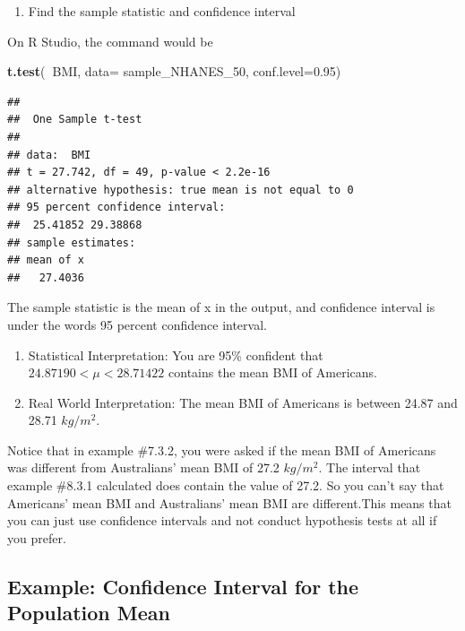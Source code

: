 \documentclass[]{book}
\newenvironment{Shaded}{\begin{snugshade}}{\end{snugshade}}
\newcommand{\DataTypeTok}[1]{\textcolor[rgb]{0.13,0.29,0.53}{#1}}
\newcommand{\DecValTok}[1]{\textcolor[rgb]{0.00,0.00,0.81}{#1}}
\newcommand{\FloatTok}[1]{\textcolor[rgb]{0.00,0.00,0.81}{#1}}
\newcommand{\KeywordTok}[1]{\textcolor[rgb]{0.13,0.29,0.53}{\textbf{#1}}}
\newcommand{\NormalTok}[1]{#1}
\newcommand{\OperatorTok}[1]{\textcolor[rgb]{0.81,0.36,0.00}{\textbf{#1}}}
\providecommand{\tightlist}{%
  \setlength{\itemsep}{0pt}\setlength{\parskip}{0pt}}
\begin{document}
\begin{enumerate}
\def\labelenumi{\arabic{enumi}.}
\setcounter{enumi}{3}
\tightlist
\item
  Find the sample statistic and confidence interval
\end{enumerate}

On R Studio, the command would be

\begin{Shaded}
\begin{Highlighting}[]
\KeywordTok{t.test}\NormalTok{(}\OperatorTok{~}\NormalTok{BMI, }\DataTypeTok{data=}\NormalTok{ sample_NHANES_}\DecValTok{50}\NormalTok{, }\DataTypeTok{conf.level=}\FloatTok{0.95}\NormalTok{)}
\end{Highlighting}
\end{Shaded}

\begin{verbatim}
## 
##  One Sample t-test
## 
## data:  BMI
## t = 27.742, df = 49, p-value < 2.2e-16
## alternative hypothesis: true mean is not equal to 0
## 95 percent confidence interval:
##  25.41852 29.38868
## sample estimates:
## mean of x 
##   27.4036
\end{verbatim}

The sample statistic is the mean of x in the output, and confidence interval is under the words 95 percent confidence interval.

\begin{enumerate}
\def\labelenumi{\arabic{enumi}.}
\setcounter{enumi}{3}
\item
  Statistical Interpretation: You are 95\% confident that \(24.87190<\mu<28.71422\) contains the mean BMI of Americans.
\item
  Real World Interpretation: The mean BMI of Americans is between 24.87 and 28.71 \(kg/m^2\).
\end{enumerate}

Notice that in example \#7.3.2, you were asked if the mean BMI of Americans was different from Australians' mean BMI of 27.2 \(kg/m^2\). The interval that example \#8.3.1 calculated does contain the value of 27.2. So you can't say that Americans' mean BMI and Australians' mean BMI are different.This means that you can just use confidence intervals and not conduct hypothesis tests at all if you prefer.

\hypertarget{example-confidence-interval-for-the-population-mean-1}{%
\subsection{Example: Confidence Interval for the Population Mean}\label{example-confidence-interval-for-the-population-mean-1}}
\end{document}
